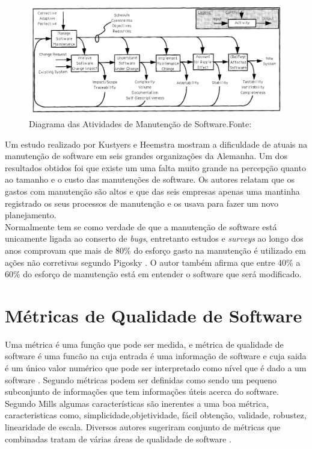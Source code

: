 \graphicspath{{figuras/}}
\begin{figure}[h]
\centering
\includegraphics[scale=0.50]{Manutencao}
\caption{Diagrama das Atividades de Manutenção de Software.Fonte:\cite{pfleeger_framework_1990}}
\label{img:modelo_manutencao}
\end{figure}
Um estudo realizado por Kustyers e Heemstra \cite{kusters} mostram a dificuldade de atuais na manutenção de software em seis grandes organizações da Alemanha. Um dos resultados obtidos foi que existe um uma falta muito grande na percepção quanto ao tamanho e o custo das manutenções de software. Os autores relatam que os gastos com manutenção são altos e que das seis empresas apenas uma mantinha registrado os seus processos de manutenção e os usava para fazer um novo planejamento. 
\\Normalmente tem se como verdade de que a manutenção de software está unicamente ligada ao conserto de \textit{bugs}, entretanto estudos e \textit{surveys} ao longo dos anos comprovam que mais de 80\% do esforço gasto na manutenção é utilizado em ações não corretivas segundo Pigosky \cite{pigosky}. O autor também afirma que entre 40\% a 60\% do esforço de manutenção está em entender o software que será modificado.

\section{Métricas de Qualidade de Software}
Uma métrica é uma função que pode ser medida, e métrica de qualidade de software é uma funcão na cuja entrada é uma informação de software e cuja saida é um único valor numérico que pode ser interpretado como nível que é dado a um software \cite{karner}. Segundo \cite{pressman} métricas podem ser definidas como sendo um pequeno subconjunto de informações que tem informações úteis acerca do software.
Segundo Mills algumas características são inerentes a uma boa métrica, caracteristicas como, simplicidade,objetividade, fácil obtenção, validade, robustez, linearidade de escala. Diversos autores sugeriram conjunto de métricas que combinadas tratam de várias áreas de qualidade de software \cite{paulo_meirelles}.


